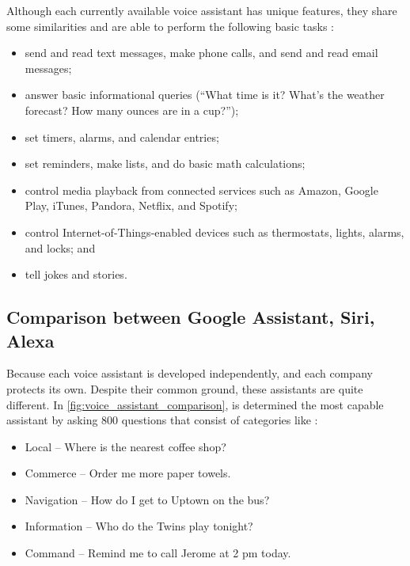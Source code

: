 Although each currently available voice assistant has unique features, they share some similarities and are able to perform the following basic tasks \citep{voice_assistants_general_hoy_2018}: 

\begin{itemize}
    \item send and read text messages, make phone calls, and send and read email messages; 
    \item answer basic informational queries (“What time is it? What’s the weather forecast? How many ounces are in a cup?”); 
    \item set timers, alarms, and calendar entries;
    \item set reminders, make lists, and do basic math calculations;
    \item control media playback from connected services such as Amazon, Google Play, iTunes, Pandora, Netflix, and Spotify; 
    \item control  Internet-of-Things-enabled  devices  such  as  thermostats,  lights, alarms, and locks; and 
    \item tell jokes and stories. 
\end{itemize}

\subsection{Comparison between Google Assistant, Siri, Alexa}

Because each voice assistant is developed independently, and each company protects its own. Despite their common ground, these assistants are quite different. In \cref{fig:voice_assistant_comparison}, is determined the most capable assistant by asking 800 questions that consist of categories like \citep{voice_assistent_comparison_munster_2019}:

\begin{itemize}
    \item Local – Where is the nearest coffee shop?
    \item Commerce – Order me more paper towels.
    \item Navigation – How do I get to Uptown on the bus?
    \item Information – Who do the Twins play tonight?
    \item Command – Remind me to call Jerome at 2 pm today.
\end{itemize}

